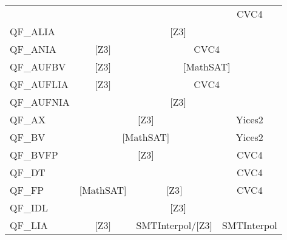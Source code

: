\begin{table}[]
\begin{center}
{\begin{tabular}{lccc}
                                & \multicolumn{1}{l}{}               & \multicolumn{1}{l|}{}                     & \multicolumn{1}{c|}{CVC4}        \\ \cline{2-4} 
\multicolumn{1}{l|}{QF\_ALIA}   & \multicolumn{3}{c|}{{[}Z3{]}}                                                                                     \\ \cline{2-4} 
\multicolumn{1}{l|}{QF\_ANIA}   & \multicolumn{1}{c|}{{[}Z3{]}}      & \multicolumn{2}{c|}{CVC4}                                                    \\ \cline{2-4} 
\multicolumn{1}{l|}{QF\_AUFBV}  & \multicolumn{1}{c|}{{[}Z3{]}}      & \multicolumn{2}{c|}{{[}MathSAT{]}}                                           \\ \cline{2-4} 
\multicolumn{1}{l|}{QF\_AUFLIA} & \multicolumn{1}{c|}{{[}Z3{]}}      & \multicolumn{2}{c|}{CVC4}                                                    \\ \cline{2-4} 
\multicolumn{1}{l|}{QF\_AUFNIA} & \multicolumn{3}{c|}{{[}Z3{]}}                                                                                     \\ \cline{2-4} 
\multicolumn{1}{l|}{QF\_AX}     & \multicolumn{2}{c|}{{[}Z3{]}}                                                  & \multicolumn{1}{c|}{Yices2}      \\ \cline{2-4} 
\multicolumn{1}{l|}{QF\_BV}     & \multicolumn{2}{c|}{{[}MathSAT{]}}                                             & \multicolumn{1}{c|}{Yices2}      \\ \cline{2-4} 
\multicolumn{1}{l|}{QF\_BVFP}   & \multicolumn{2}{c|}{{[}Z3{]}}                                                  & \multicolumn{1}{c|}{CVC4}        \\ \cline{2-4} 
QF\_DT                          & \multicolumn{1}{l}{}               & \multicolumn{1}{l|}{}                     & \multicolumn{1}{c|}{CVC4}        \\ \cline{2-4} 
\multicolumn{1}{l|}{QF\_FP}     & \multicolumn{1}{c|}{{[}MathSAT{]}} & \multicolumn{1}{c|}{{[}Z3{]}}             & \multicolumn{1}{c|}{CVC4}        \\ \cline{2-4} 
\multicolumn{1}{l|}{QF\_IDL}    & \multicolumn{3}{c|}{{[}Z3{]}}                                                                                     \\ \cline{2-4} 
\multicolumn{1}{l|}{QF\_LIA}    & \multicolumn{1}{c|}{{[}Z3{]}}      & \multicolumn{1}{c|}{SMTInterpol/{[}Z3{]}} & \multicolumn{1}{c|}{SMTInterpol} \\ \cline{2-4} 

\end{tabular}}
\end{center}
\end{table}
